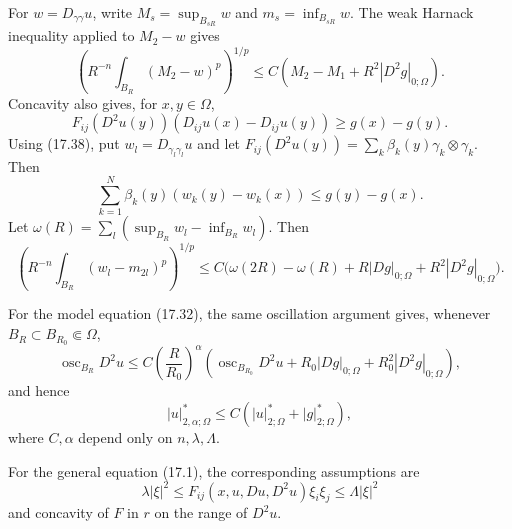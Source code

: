 For $w=D_{\gamma\gamma}u$, write
$M_s=\sup_{B_{sR}}w$ and $m_s=\inf_{B_{sR}}w$. The weak Harnack inequality
applied to $M_2-w$ gives
\begin{equation}
\tag{17.36}
\left(R^{-n}\int_{B_R}(M_2-w)^p\right)^{1/p}
\leq C(M_2-M_1+R^2|D^2g|_{0;\Omega}).
\end{equation}
Concavity also gives, for $x,y\in\Omega$,
\begin{equation}
\tag{17.37}
F_{ij}(D^2u(y))(D_{ij}u(x)-D_{ij}u(y))
\geq g(x)-g(y).
\end{equation}
Using (17.38), put $w_l=D_{\gamma_l\gamma_l}u$ and let
$F_{ij}(D^2u(y))=\sum_k\beta_k(y)\gamma_k\otimes\gamma_k$. Then
\begin{equation}
\tag{17.39}
\sum_{k=1}^N\beta_k(y)(w_k(y)-w_k(x))
\leq g(y)-g(x).
\end{equation}
Let
$\omega(R)=\sum_l(\sup_{B_R}w_l-\inf_{B_R}w_l)$. Then
\begin{equation}
\tag{17.40}
\left(R^{-n}\int_{B_R}(w_l-m_{2l})^p\right)^{1/p}
\leq C\bigl(\omega(2R)-\omega(R)
+R|Dg|_{0;\Omega}+R^2|D^2g|_{0;\Omega}\bigr).
\end{equation}

For the model equation (17.32), the same oscillation argument gives, whenever
$B_R\subset B_{R_0}\Subset\Omega$,
\begin{equation}\tag{17.41}
\operatorname{osc}_{B_R}D^2u\le
C\left(\frac R{R_0}\right)^\alpha
\left(\operatorname{osc}_{B_{R_0}}D^2u
+R_0|Dg|_{0;\Omega}+R_0^2|D^2g|_{0;\Omega}\right),
\end{equation}
and hence
\begin{equation}\tag{17.42}
|u|^*_{2,\alpha;\Omega}\le
C\left(|u|^*_{2;\Omega}+|g|^*_{2;\Omega}\right),
\end{equation}
where $C,\alpha$ depend only on $n,\lambda,\Lambda$.

For the general equation (17.1), the corresponding assumptions are
\begin{equation}\tag{17.43}
\lambda|\xi|^2\le F_{ij}(x,u,Du,D^2u)\xi_i\xi_j\le\Lambda|\xi|^2
\end{equation}
and concavity of $F$ in $r$ on the range of $D^2u$.

